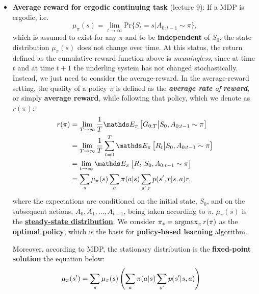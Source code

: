 \documentclass[11pt]{article}
\begin{document}
\begin{itemize}
\item \textbf{Average reward for ergodic continuing task} (lecture 9): If a MDP is ergodic, i.e. $$\mu_{\pi}(s) = \lim_{t\rightarrow \infty} \text{Pr}\{S_t =s |A_{0:t-1} \sim \pi\},$$ which is assumed to exist for any $\pi$ and to be \textbf{independent} of $S_0$, the state distribution $\mu_{\pi}(s)$ does not change over time. At this status, the return defined as the cumulative reward function above is \emph{meaningless}, since at time $t$ and at time $t+1$ the underling system has not changed stochastically. Instead, we just need to consider the average-reward. In the average-reward setting, the quality of a policy $\pi$ is defined as the \emph{\textbf{average rate} of \textbf{reward}}, or simply \textbf{average reward}, while following that policy, which we denote as $r(\pi)$:
\begin{align}
r(\pi) &= \lim_{T\rightarrow \infty}\frac{1}{T}\E{\pi}{G_{0:T} \big| S_{0}, A_{0:t-1} \sim \pi} \nonumber\\
 &=\lim_{T\rightarrow \infty}\frac{1}{T}\sum_{t=0}^{T}\E{\pi}{R_{t} \big| S_{0}, A_{0:t-1} \sim \pi}  \label{eqn: avg_reward_discount_continuing}\\
&= \lim_{t\rightarrow \infty}\E{\pi}{R_{t} \big| S_{0}, A_{0:t-1} \sim \pi}  \label{eqn: avg_reward_discount_continuing2}\\
&= \sum_{s}\mu_{\pi}(s)\sum_{a}\pi(a|s) \sum_{s', r}p(s', r| s, a)r,  \label{eqn: avg_reward_discount_continuing3}
\end{align}  where the expectations are conditioned on the initial state, $S_0$, and on the subsequent actions, $A_0, A_1, \ldots, A_{t-1}$, being taken according to $\pi$. $\mu_{\pi}(s)$ is the \underline{\textbf{steady-state distribution}}. We consider $\pi_{*} = \operatorname{argmax}_{\pi}r(\pi)$ as the \textbf{optimal policy}, which is the basis for \textbf{policy-based learning} algorithm. 

Moreover, according to MDP, the stationary distribution is the \textbf{fixed-point solution} the equation below:
\begin{align}
\mu_{\pi}(s') &= \sum_{s}\mu_{\pi}(s)\left(\sum_{a}\pi(a|s) \sum_{s'}p(s'| s, a)\right) \label{eqn: stationary_dist_eqn}
\end{align} 


\end{itemize}
\end{document}
